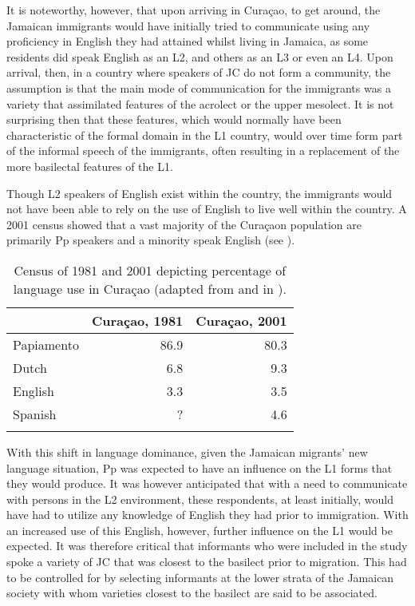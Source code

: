 \documentclass[output=paper,colorlinks,citecolor=brown]{langscibook}
\begin{document}
It is noteworthy, however, that upon arriving in Curaçao, to get around, the Jamaican immigrants would have initially tried to communicate using any proficiency in English they had attained whilst living in Jamaica, as some residents did speak English as an L2, and others as an L3 or even an L4. Upon arrival, then, in a country where speakers of JC do not form a community, the assumption is that the main mode of communication for the immigrants was a variety that assimilated features of the acrolect or the upper mesolect. It is not surprising then that these features, which would normally have been characteristic of the formal domain in the L1 country, would over time form part of the informal speech of the immigrants, often resulting in a replacement of the more basilectal features of the L1.

Though L2 speakers of English exist within the country, the immigrants would not have been able to rely on the use of English to live well within the country. A 2001 census showed that a vast majority of the Curaçaon population are primarily Pp speakers and a minority speak English (see ).

\begin{table}
\begin{tabular}{lrr}
\lsptoprule
& Curaçao, 1981 & Curaçao, 2001\\\midrule
Papiamento & 86.9 & 80.3\\
Dutch & 6.8 & 9.3\\
English & 3.3 & 3.5\\
Spanish & ? & 4.6\\
\lspbottomrule
\end{tabular}
\caption{Census of 1981 and 2001 depicting percentage of language use in Curaçao (adapted from \cite[143]{Maurer1998} and \cite[238]{kester2012language} in \cite{Jacobs2013}).}
\label{tab:messam:1}
\end{table}

With this shift in language dominance, given the Jamaican migrants’ new language situation, Pp was expected to have an influence on the L1 forms that they would produce. It was however anticipated that with a need to communicate with persons in the L2 environment, these respondents, at least initially, would have had to utilize any knowledge of English they had prior to immigration. With an increased use of this English, however, further influence on the L1 would be expected. It was therefore critical that informants who were included in the study spoke a variety of JC that was closest to the basilect prior to migration. This had to be controlled for by selecting informants at the lower strata of the Jamaican society with whom varieties closest to the basilect are said to be associated.
\end{document}
